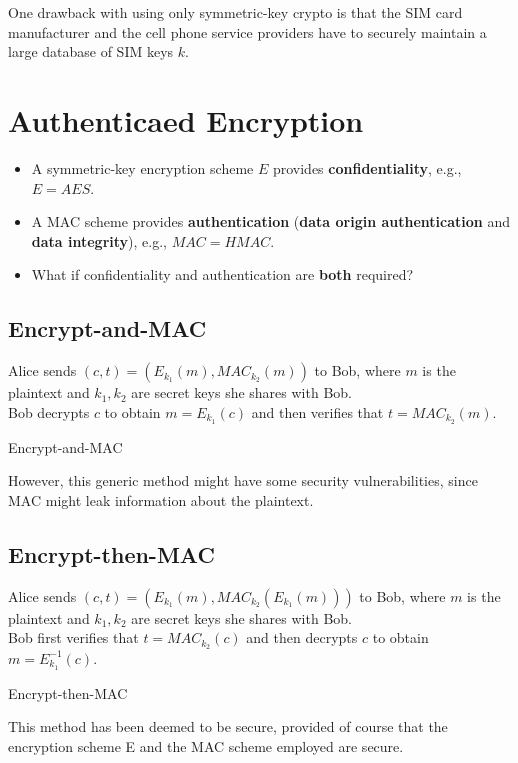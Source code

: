 \documentclass[12pt,titlepage]{article}
\let\stdsection\section
\renewcommand\section{\clearpage\stdsection}
\begin{document}
One drawback with using only symmetric-key crypto is that the SIM card manufacturer and the cell phone service providers have to securely maintain a large database of SIM keys $k$.

\section{Authenticaed Encryption}
\begin{itemize}
	\item A symmetric-key encryption scheme $E$ provides \textbf{confidentiality}, e.g., $E = AES$.
	\item A MAC scheme provides \textbf{authentication} (\textbf{data origin authentication} and \textbf{data integrity}), e.g., $MAC = HMAC$.
	\item What if confidentiality and authentication are \textbf{both} required?
\end{itemize}

\subsection{Encrypt-and-MAC}
\begin{algorithm}
	Alice sends $(c, t) = (E_{k_1} (m), MAC_{k_2} (m))$ to Bob, where $m$ is the plaintext and $k_1, k_2$ are secret keys she shares with Bob.\\
	Bob decrypts $c$ to obtain $m = E_{k_1} (c)$ and then verifies that $t = MAC_{k_2} (m)$.
	\caption{Encrypt-and-MAC}
\end{algorithm}

However, this generic method might have some security vulnerabilities, since MAC might leak information about the plaintext. 

\subsection{Encrypt-then-MAC}
\begin{algorithm}
	Alice sends $(c, t) = (E_{k_1} (m), MAC_{k_2} (E_{k_1} (m)))$ to Bob, where $m$ is the plaintext and $k_1 , k_2$ are secret keys she shares with Bob.\\
	Bob first verifies that $t = MAC_{k_2} (c)$ and then decrypts $c$ to obtain $m = E_{k_1}^{-1} (c)$.
	\caption{Encrypt-then-MAC}
\end{algorithm}

This method has been deemed to be secure, provided of course that the encryption scheme E and the MAC scheme employed are secure.
\end{document}

